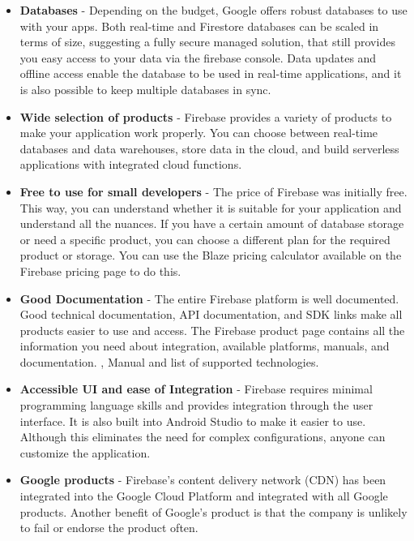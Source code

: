 \begin{itemize}
    \item \textbf{Databases} - Depending on the budget, Google offers robust databases to use with your apps. Both real-time and Firestore databases can be scaled in terms of size, suggesting a fully secure managed solution, that still provides you easy access to your data via the firebase console. Data updates and offline access enable the database to be used in real-time applications, and it is also possible to keep multiple databases in sync.
    \item \textbf{Wide selection of products} - Firebase provides a variety of products to make your application work properly. You can choose between real-time databases and data warehouses, store data in the cloud, and build serverless applications with integrated cloud functions.
    \item \textbf{Free to use for small developers} - The price of Firebase was initially free. This way, you can understand whether it is suitable for your application and understand all the nuances. If you have a certain amount of database storage or need a specific product, you can choose a different plan for the required product or storage. You can use the Blaze pricing calculator available on the Firebase pricing page to do this.
    \item \textbf{Good Documentation} - The entire Firebase platform is well documented. Good technical documentation, API documentation, and SDK links make all products easier to use and access. The Firebase product page contains all the information you need about integration, available platforms, manuals, and documentation. , Manual and list of supported technologies.
    \item \textbf{Accessible UI and ease of Integration} - Firebase requires minimal programming language skills and provides integration through the user interface. It is also built into Android Studio to make it easier to use. Although this eliminates the need for complex configurations, anyone can customize the application.
    \item \textbf{Google products} - Firebase's content delivery network (CDN) has been integrated into the Google Cloud Platform and integrated with all Google products. Another benefit of Google’s product is that the company is unlikely to fail or endorse the product often.
\end{itemize}

